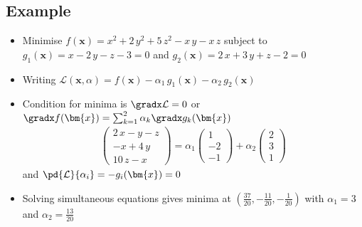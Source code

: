 
\begin{slide}
\section[-2]{Example}

\begin{PauseHighLight}
  \begin{itemize}
  \item Minimise $f(\bm{x}) = x^2 + 2\,y^2 + 5\,z^2- x\,y -x\,z$ subject
  to $g_1(\bm{x}) = x - 2\,y -z -3 = 0$ and $g_2(\bm{x}) = 
  2\,x + 3\,y +z - 2 = 0$ \pause
  \item Writing $\mathcal{L}(\bm{x},\alpha) = f(\bm{x}) - \alpha_1\,g_1(\bm{x}) 
    - \alpha_2\,g_2(\bm{x})$\pause
  \item Condition for minima is $\gradx \mathcal{L} = 0$ or $\gradx
  f(\bm{x}) = \sum_{k=1}^2 \alpha_k \gradx g_k(\bm{x})$
    \begin{align*}
      \begin{pmatrix}
        2\,x -y -z\\ -x + 4\,y \\ 10\,z -x
      \end{pmatrix}
      = \alpha_1 
      \begin{pmatrix}
        1 \\ -2 \\ -1
      \end{pmatrix}
      + \alpha_2
      \begin{pmatrix}
        2 \\ 3 \\ 1
      \end{pmatrix}
    \end{align*}
    and $\pd{\mathcal{L}}{\alpha_i} = -g_i(\bm{x}) = 0$\pause
  \item Solving simultaneous equations gives minima at $(\frac{37}{20}, -
  \frac{11}{20}, -\frac{1}{20})$ with $\alpha_1=3$ and
  $\alpha_2=\frac{13}{20}$\pause
  \end{itemize}
\end{PauseHighLight}

\end{slide}

\Outline %

